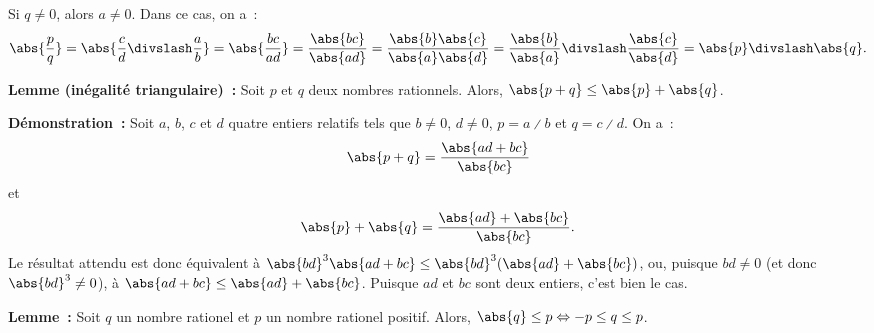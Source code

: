     Si $q \neq 0$, alors $a \neq 0$. 
    Dans ce cas, on a :
    \begin{equation*}
        \abs{\frac{p}{q}} 
        = \abs{\frac{c}{d} \divslash \frac{a}{b}}
        = \abs{\frac{b c}{a d}}
        = \frac{\abs{b c}}{\abs{a d}}
        = \frac{\abs{b} \abs{c}}{\abs{a} \abs{d}}
        = \frac{\abs{b}}{\abs{a}} \divslash \frac{\abs{c}}{\abs{d}}
        = \abs{p} \divslash \abs{q} .
    \end{equation*}
    
    \done

\medskip

\noindent\textbf{Lemme (inégalité triangulaire) :} Soit $p$ et $q$ deux nombres rationnels. 
    Alors, $\abs{p + q} \leq \abs{p} + \abs{q}$.

\medskip

\noindent\textbf{Démonstration :} 
    Soit $a$, $b$, $c$ et $d$ quatre entiers relatifs tels que $b \neq 0$, $d \neq 0$, $p = a \divslash b$ et $q = c \divslash d$.
    On a : 
    \begin{equation*}
        \abs{p + q} = \frac{\abs{a d + b c}}{\abs{b c}}
    \end{equation*}
    et 
    \begin{equation*}
        \abs{p} + \abs{q} = \frac{\abs{a d} + \abs{b c}}{\abs{b c}} .
    \end{equation*}
    Le résultat attendu est donc équivalent à $\abs{b d}^3 \abs{a d + b c} \leq \abs{b d}^3 (\abs{a d} + \abs{b c})$, ou, puisque $b d \neq 0$ (et donc $\abs{b d}^3 \neq 0$), à $ \abs{a d + b c} \leq \abs{a d} + \abs{b c}$. 
    Puisque $a d$ et $b c$ sont deux entiers, c'est bien le cas.

    \done

\medskip

\noindent\textbf{Lemme :} Soit $q$ un nombre rationel et $p$ un nombre rationel positif. 
    Alors, $\abs{q} \leq p \Leftrightarrow -p \leq q \leq p$.

\medskip

